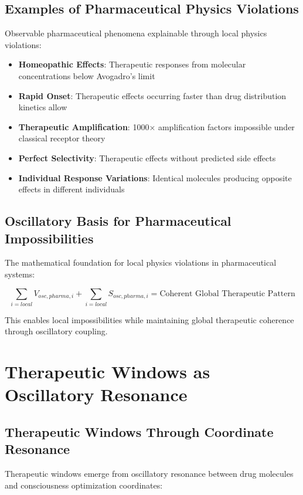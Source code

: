 \documentclass[12pt,a4paper]{article}
\begin{document}
\subsection{Examples of Pharmaceutical Physics Violations}

Observable pharmaceutical phenomena explainable through local physics violations:

\begin{itemize}
\item \textbf{Homeopathic Effects}: Therapeutic responses from molecular concentrations below Avogadro's limit
\item \textbf{Rapid Onset}: Therapeutic effects occurring faster than drug distribution kinetics allow
\item \textbf{Therapeutic Amplification}: 1000× amplification factors impossible under classical receptor theory
\item \textbf{Perfect Selectivity}: Therapeutic effects without predicted side effects
\item \textbf{Individual Response Variations}: Identical molecules producing opposite effects in different individuals
\end{itemize}

\subsection{Oscillatory Basis for Pharmaceutical Impossibilities}

The mathematical foundation for local physics violations in pharmaceutical systems:

\begin{equation}
\sum_{i=local} V_{osc,pharma,i} + \sum_{i=local} S_{osc,pharma,i} = \text{Coherent Global Therapeutic Pattern}
\end{equation}

This enables local impossibilities while maintaining global therapeutic coherence through oscillatory coupling.

\section{Therapeutic Windows as Oscillatory Resonance}

\subsection{Therapeutic Windows Through Coordinate Resonance}

Therapeutic windows emerge from oscillatory resonance between drug molecules and consciousness optimization coordinates:
\end{document}
